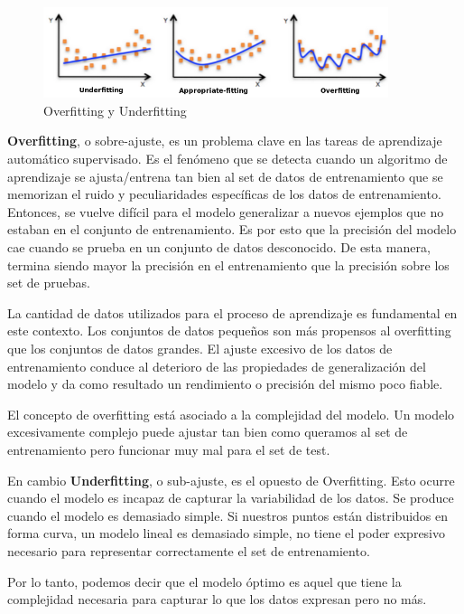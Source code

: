 \documentclass[12pt,a4paper]{article}
\begin{document}
\begin{sloppypar}
\begin{figure}[H]    %
 \centering
 \includegraphics[width=0.9\textwidth]{images/Fitting.png}
 \caption{Overfitting y Underfitting\cite{apunte_uba}}
 \label{fig:fitting}
\end{figure}

\textbf{Overfitting}, o sobre-ajuste, es un problema clave en las tareas de aprendizaje automático supervisado.
Es el fenómeno que se detecta cuando un algoritmo de aprendizaje se ajusta/entrena tan bien al set de datos de entrenamiento que se memorizan el ruido y peculiaridades específicas de los datos de entrenamiento. Entonces, se vuelve difícil para el modelo generalizar a nuevos ejemplos que no estaban en el conjunto de entrenamiento. Es por esto que la precisión del modelo cae cuando se prueba en un conjunto de datos desconocido. De esta manera, termina siendo mayor la precisión en el entrenamiento que la precisión sobre los set de pruebas.

La cantidad de datos utilizados para el proceso de aprendizaje es fundamental en este contexto. Los conjuntos de datos pequeños son más propensos al overfitting que los conjuntos de datos grandes. El ajuste excesivo de los datos de entrenamiento conduce al deterioro de las propiedades de generalización del modelo y da como resultado un rendimiento o precisión del mismo poco fiable\cite{over_and_under}.

El concepto de overfitting está asociado a la complejidad del modelo. Un modelo excesivamente complejo puede ajustar tan bien como queramos al set de entrenamiento pero funcionar muy mal para el set de test\cite{apunte_uba}.

En cambio \textbf{Underfitting}, o sub-ajuste, es el opuesto de Overfitting. Esto ocurre cuando el modelo es incapaz de capturar la variabilidad de los datos. Se produce cuando el modelo es demasiado simple. Si nuestros puntos están distribuidos en forma curva, un modelo lineal es demasiado simple, no tiene el poder expresivo necesario para representar correctamente el set de entrenamiento\cite{apunte_uba}.

Por lo tanto, podemos decir que el modelo óptimo es aquel que tiene la complejidad necesaria para capturar lo que los datos expresan pero no más.


\end{sloppypar}
\end{document}
